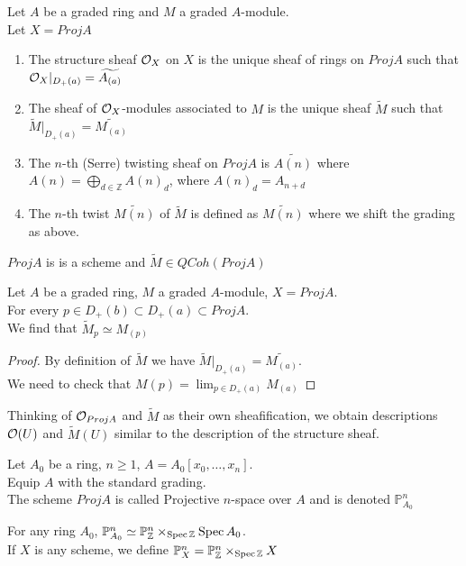 \documentclass[../main.tex]{subfiles}
\begin{document}
\begin{defn}
	Let $A$ be a graded ring and $M$ a graded $A$-module.\\
	Let $X= Proj A$
	\begin{enumerate}
		\item The structure sheaf  $\mathcal{O}_X$ on $X$ is the unique sheaf of rings on $Proj A$ such that $\mathcal{O}_X|_{D_+( a) } =\widetilde{A_{( a) } }$ 
		\item The sheaf of $\mathcal{O}_X$-modules associated to $M$ is the unique sheaf $\widetilde{M}$ such that $\widetilde{M}|_{D_+( a) } = \widetilde{M_{( a) }} $ 
		\item The $n$-th (Serre) twisting sheaf on $Proj A$ is $\widetilde{A( n) }$ where $A( n) = \bigoplus_{d\in \mathbb{Z}} A( n) _d$, where $A( n)_d= A_{n+d} $ 
		\item The $n$-th twist $\widetilde{M( n) }$ 	of $\widetilde{M}$ is defined as $\widetilde{M( n) }$ where we shift the grading as above.
	\end{enumerate}
\end{defn}
$Proj A$ is is a scheme and $\widetilde{M} \in QCoh( Proj A) $ 
\begin{crly}
Let $A$ be a graded ring, $M$  a graded $A$-module, $X= Proj A$.\\
For every $p\in D_+( b) \subset D_+( a) \subset Proj A$.\\
We find that $\widetilde{M}_p\simeq M_{( p) } $ 
\end{crly}
\begin{proof}
	By definition of $\tilde M$ we have $\widetilde { M}|_{D_+( a) } = \widetilde{M_{( a) } }$.\\
	We need to check that $M( p) = \lim_{p \in D_+( a) } M_{( a) } $ 
\end{proof}
\begin{rmq}
	Thinking of $\mathcal{O}_{Proj A} $ and $\widetilde{M}$ as their own sheafification, we obtain descriptions $\mathcal{O}( U) $ and $\widetilde{M}( U) $ similar to the description of the structure sheaf.
\end{rmq}
\begin{defn}
	Let $A_0$ be a ring, $n \geq 1$, $A= A_0[x_0,\ldots,x_n]$.\\
	Equip $A$ with the standard grading.\\
	The scheme $Proj A$ is called Projective $n$-space over $A$ and is denoted $\mathbb{P}^{n}_{A_0} $ \\
\end{defn}
\begin{rmq}
For any ring $A_0$, $\mathbb{P}^{n}_{A_0} \simeq \mathbb{P}^{n}_{ \mathbb{Z}} \times_{ \operatorname{Spec} \mathbb{Z}} \operatorname{Spec} A_0$.\\
If $X$ is any scheme, we define $ \mathbb{P}^{n}_X = \mathbb{P}^{n}_{\mathbb{Z}} \times_{\operatorname{Spec} \mathbb{Z}} X$ 
\end{rmq}
\end{document}
